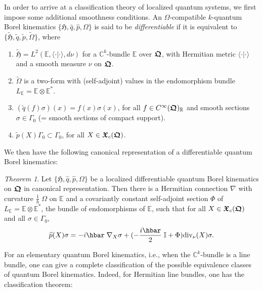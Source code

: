 \documentclass[11pt]{amsart}
\numberwithin{equation}{section}
\theoremstyle{remark}
\newcommand\HH{\mathfrak H}
\newcommand\RR{\mathbb R}
\newtheorem{theorem}[defi]{Theorem}
\newcommand{\betheo}{\begin{theorem}}
\newcommand{\entheo}{\end{theorem}}
\newcommand{\be}{\begin{equation}}
\newcommand{\en}{\end{equation}}
\newcommand{\htil}{\widetilde{\mathfrak H}}
\newcommand{\bfrakQ}{\mbox{\boldmath $\mathfrak Q$}}
\newcommand{\bfrakX}{\mbox{\boldmath $\mathfrak X$}}
\newcommand{\CinfRQ}{C^\infty(\bfrakQ)_{\RR}}
\begin{document}
In order to arrive at a classification theory of localized quantum systems, we
first impose some additional smoothness conditions. An $\Omega$-compatible
$k$-quantum Borel kinematics $\{ \HH , \widehat{q}, \widehat{p}, \Omega\}$ is
said to be {\em differentiable} if it is equivalent to $\{\htil, \widetilde{q},
\widetilde{p}, \widetilde{\Omega}\}$, where

\begin{enumerate}

\item $\htil = L^2 (\mathbb E , \langle\cdot\vert\cdot\rangle , d\nu )$ for a
      ${\mathbb C}^k$-bundle $\mathbb E$ over $\bfrakQ$, with Hermitian metric
      $\langle\cdot\vert\cdot\rangle$ and a smooth measure $\nu$ on $\bfrakQ$.

\item $\widetilde{\Omega}$ is a two-form with (self-adjoint) values in the
      endomorphism bundle $L_{\mathbb E} = {\mathbb E}\otimes {\mathbb E}^*$.

\item $(\widetilde{q}(f)\sigma )(x) = f(x)\sigma (x)$, for all $f \in
      \CinfRQ$ and smooth sections $\sigma \in \Gamma_0$
      (= smooth sections of compact support).

\item $\widetilde{p} (X)\Gamma_0 \subset \Gamma_0$, for all $X \in \bfrakX_c
      (\bfrakQ )$.

\end{enumerate}

We then have the following canonical representation of a differentiable quantum
Borel kinematics:

\betheo
Let $\{ \HH , \widehat{q}, \widehat{p}, \Omega\}$ be a localized differentiable
quantum Borel kinematics on $\bfrakQ$ in canonical representation. Then there
is a Hermitian connection $\nabla$ with curvature ${\displaystyle \frac
1\hbar}\;\Omega$ on $\mathbb E$ and a covariantly constant self-adjoint section
$\Phi$ of $L_{\mathbb E} = {\mathbb E}\otimes {\mathbb E}^*$, the bundle of
endomorphisms of $\mathbb E$, such that for all $X \in \bfrakX_c (\bfrakQ )$
and all $\sigma \in \Gamma_0$,
\be
\widehat{p}(X)\sigma = -i\hbar\;\nabla_X\sigma
    + (-\frac {i\hbar}2\;\mathbb I + \Phi )
    \mbox{\rm div}_\nu (X)\sigma .
\label{diffquant}
\en
\entheo


For an elementary quantum Borel kinematics, i.e., when the
${\mathbb C}^k$-bundle is a line bundle, one can give a complete classification
of the possible equivalence classes of quantum Borel kinematics. Indeed, for
Hermitian line bundles, one has the classification theorem:
\end{document}
